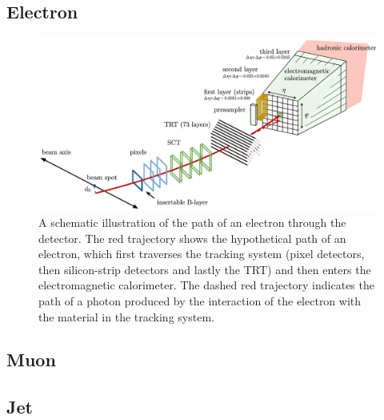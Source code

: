 \subsection{Electron}
\begin{figure}[bht]
    \begin{centering}	
    \includegraphics[width=.8\textwidth]{Reconstruction_plots/electron.jpg}
    \caption{A schematic illustration of the path of an electron through the detector. The red trajectory shows the
    hypothetical path of an electron, which first traverses the tracking system (pixel detectors, then silicon-strip detectors
    and lastly the TRT) and then enters the electromagnetic calorimeter. The dashed red trajectory indicates the path of a
    photon produced by the interaction of the electron with the material in the tracking system\cite{PERF-2017-01}.
        }
    \label{fig:electron_recon}
    \end{centering}
\end{figure}
\subsection{Muon}
\subsection{Jet}
